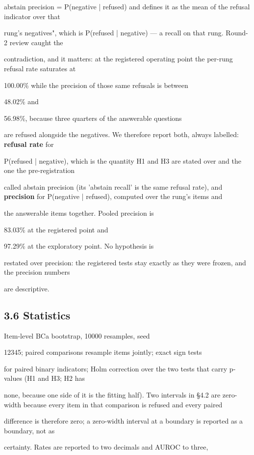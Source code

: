 abstain precision = P(negative | refused) and defines it as the mean of the refusal indicator over that

rung's negatives", which is P(refused | negative) --- a recall on that rung. Round-2 review caught the

contradiction, and it matters: at the registered operating point the per-rung refusal rate saturates at

100.00\% while the precision of those same refusals is between

48.02\% and

56.98\%, because three quarters of the answerable questions

are refused alongside the negatives. We therefore report both, always labelled: \textbf{refusal rate} for

P(refused | negative), which is the quantity H1 and H3 are stated over and the one the pre-registration

called abstain precision (its 'abstain recall' is the same refusal rate), and \textbf{precision} for P(negative | refused), computed over the rung's items and

the answerable items together. Pooled precision is

83.03\% at the registered point and

97.29\% at the exploratory point. No hypothesis is

restated over precision: the registered tests stay exactly as they were frozen, and the precision numbers

are descriptive.

\subsection{3.6 Statistics}
Item-level BCa bootstrap, 10000 resamples, seed

12345; paired comparisons resample items jointly; exact sign tests

for paired binary indicators; Holm correction over the two tests that carry p-values (H1 and H3; H2 has

none, because one side of it is the fitting half). Two intervals in §4.2 are zero-width because every item in that comparison is refused and every paired

difference is therefore zero; a zero-width interval at a boundary is reported as a boundary, not as

certainty. Rates are reported to two decimals and AUROC to three,


